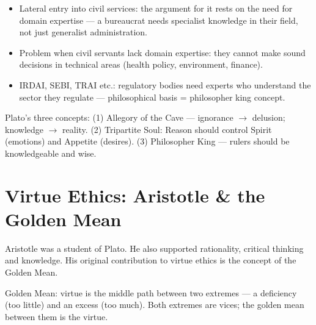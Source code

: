 \begin{GovtPolicy}
\begin{itemize}
\item Lateral entry into civil services: the argument for it rests on the need for domain expertise --- a bureaucrat needs specialist knowledge in their field, not just generalist administration.
\item Problem when civil servants lack domain expertise: they cannot make sound decisions in technical areas (health policy, environment, finance).
\item IRDAI, SEBI, TRAI etc.: regulatory bodies need experts who understand the sector they regulate --- philosophical basis = philosopher king concept.
\end{itemize}
\end{GovtPolicy}

\begin{QuickRevision}
Plato's three concepts: (1) Allegory of the Cave --- ignorance $\rightarrow$ delusion; knowledge $\rightarrow$ reality. (2) Tripartite Soul: Reason should control Spirit (emotions) and Appetite (desires). (3) Philosopher King --- rulers should be knowledgeable and wise.
\end{QuickRevision}

\section{Virtue Ethics: Aristotle \& the Golden Mean}

Aristotle was a student of Plato. He also supported rationality, critical thinking and knowledge. His original contribution to virtue ethics is the concept of the Golden Mean.

\begin{KeyConcept}
Golden Mean: virtue is the middle path between two extremes --- a deficiency (too little) and an excess (too much). Both extremes are vices; the golden mean between them is the virtue.
\end{KeyConcept}

